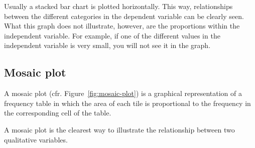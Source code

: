 Usually a stacked bar chart is plotted horizontally. This way, relationships between the different categories in the dependent variable can be clearly seen. What this graph does not illustrate, however, are the proportions within the independent variable. For example, if one of the different values in the independent variable is very small, you will not see it in the graph.

\subsection{Mosaic plot}

A mosaic plot (cfr. Figure~\ref{fig:mosaic-plot}) is a graphical representation of a frequency table in which the area of each tile is proportional to the frequency in the corresponding cell of the table.

A mosaic plot is the clearest way to illustrate the relationship between two qualitative variables.

